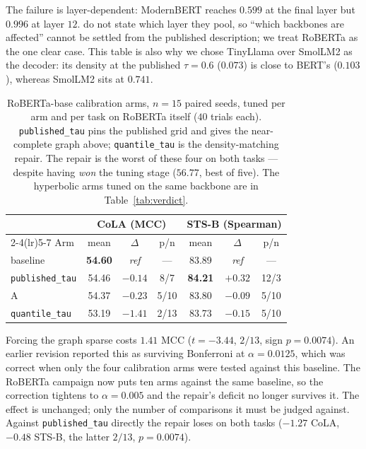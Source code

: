 \documentclass{article}
\begin{document}
The failure is layer-dependent: ModernBERT reaches $0.599$ at the final layer
but $0.996$ at layer $12$. \citet{mantri2026glot} do not state which layer they
pool, so ``which backbones are affected'' cannot be settled from the published
description; we treat RoBERTa as the one clear case. This table is also why we
chose TinyLlama over SmolLM2 as the decoder: its density at the published
$\tau=0.6$ ($0.073$) is close to BERT's ($0.103$), whereas SmolLM2 sits at
$0.741$.

\begin{table}[h]
\caption{RoBERTa-base calibration arms, $n=15$ paired seeds, tuned per arm and
per task on RoBERTa itself ($40$ trials each). \texttt{published\_tau} pins the
published grid and gives the near-complete graph above; \texttt{quantile\_tau}
is the density-matching repair. The repair is the worst of these four on both
tasks --- despite having \emph{won} the tuning stage ($56.77$, best of five).
The hyperbolic arms tuned on the same backbone are in
Table~\ref{tab:verdict}.}
\label{tab:roberta}
\begin{center}
\small
\begin{tabular}{lcccccc}
\toprule
 & \multicolumn{3}{c}{CoLA (MCC)} & \multicolumn{3}{c}{STS-B (Spearman)} \\
\cmidrule(lr){2-4}\cmidrule(lr){5-7}
Arm & mean & $\Delta$ & p/n & mean & $\Delta$ & p/n \\
\midrule
baseline                & \textbf{54.60} & \emph{ref} & --- & 83.89 & \emph{ref} & --- \\
\texttt{published\_tau} & 54.46 & $-0.14$ & \phantom{0}8/7 & \textbf{84.21} & $\mathbf{+0.32}$ & 12/3 \\
A                       & 54.37 & $-0.23$ & \phantom{0}5/10 & 83.80 & $-0.09$ & \phantom{0}5/10 \\
\texttt{quantile\_tau}  & 53.19 & $\mathbf{-1.41}$ & \phantom{0}2/13 & 83.73 & $-0.15$ & \phantom{0}5/10 \\
\bottomrule
\end{tabular}
\end{center}
\end{table}

Forcing the graph sparse costs $1.41$ MCC ($t=-3.44$, $2/13$, sign $p=0.0074$).
An earlier revision reported this as surviving Bonferroni at $\alpha=0.0125$,
which was correct when only the four calibration arms were tested against this
baseline. The RoBERTa campaign now puts ten arms against the same baseline, so
the correction tightens to $\alpha=0.005$ and the repair's deficit no longer
survives it. The effect is unchanged; only the number of comparisons it must be
judged against. Against \texttt{published\_tau} directly the repair loses on both
tasks ($-1.27$ CoLA, $-0.48$ STS-B, the latter $2/13$, $p=0.0074$).
\end{document}
